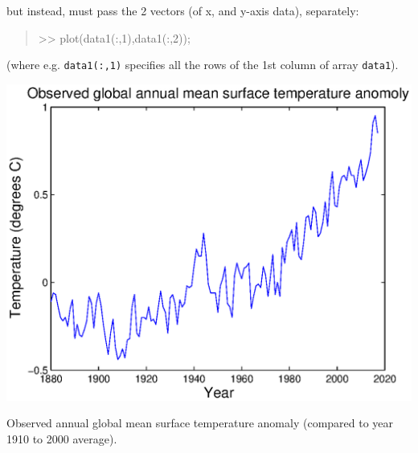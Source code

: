 \documentclass{tufte-book} %
\newenvironment{docspec}{\begin{quotation}\ttfamily\parskip0pt\parindent0pt\ignorespaces}{\end{quotation}}
\begin{document}
\noindent but instead, must pass the 2 vectors (of x, and y-axis data), separately:

\begin{docspec}
>> plot(data1(:,1),data1(:,2));
\end{docspec}

\noindent (where e.g. \texttt{data1(:,1)} specifies all the rows of the 1st column of array \texttt{data1}).

\begin{marginfigure}[-4.5in]
\includegraphics[width=\linewidth]{ch1-plot-temperature1.eps}
\caption{Observed annual global mean surface temperature anomaly (compared to year 1910 to 2000 average).}
\label{fig:ch1-plot-temperature1}
\end{marginfigure}
\end{document}
